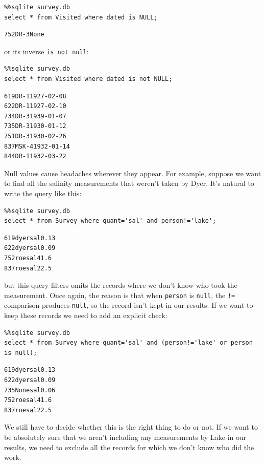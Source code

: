 \documentclass{book}
\begin{document}
\begin{verbatim}
%%sqlite survey.db
select * from Visited where dated is NULL;
\end{verbatim}

\begin{verbatim}
752DR-3None
\end{verbatim}

or its inverse \texttt{is not null}:

\begin{verbatim}
%%sqlite survey.db
select * from Visited where dated is not NULL;
\end{verbatim}

\begin{verbatim}
619DR-11927-02-08
622DR-11927-02-10
734DR-31939-01-07
735DR-31930-01-12
751DR-31930-02-26
837MSK-41932-01-14
844DR-11932-03-22
\end{verbatim}

Null values cause headaches wherever they appear. For example, suppose
we want to find all the salinity measurements that weren't taken by
Dyer. It's natural to write the query like this:

\begin{verbatim}
%%sqlite survey.db
select * from Survey where quant='sal' and person!='lake';
\end{verbatim}

\begin{verbatim}
619dyersal0.13
622dyersal0.09
752roesal41.6
837roesal22.5
\end{verbatim}

but this query filters omits the records where we don't know who took
the measurement. Once again, the reason is that when \texttt{person} is
\texttt{null}, the \texttt{!=} comparison produces \texttt{null}, so the
record isn't kept in our results. If we want to keep these records we
need to add an explicit check:

\begin{verbatim}
%%sqlite survey.db
select * from Survey where quant='sal' and (person!='lake' or person is null);
\end{verbatim}

\begin{verbatim}
619dyersal0.13
622dyersal0.09
735Nonesal0.06
752roesal41.6
837roesal22.5
\end{verbatim}

We still have to decide whether this is the right thing to do or not. If
we want to be absolutely sure that we aren't including any measurements
by Lake in our results, we need to exclude all the records for which we
don't know who did the work.
\end{document}
